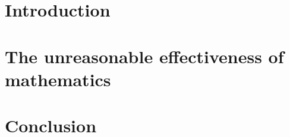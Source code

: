 \documentclass[12pt,oneside,letterpaper]{report}
\begin{document}

%

\chapter{Introduction} \label{ch1}


\chapter{The unreasonable effectiveness of mathematics} \label{ch2}


\chapter{Conclusion} \label{ch6}

\label{chp-conclusion}




% 
%
%
%
%




%
\end{document}
